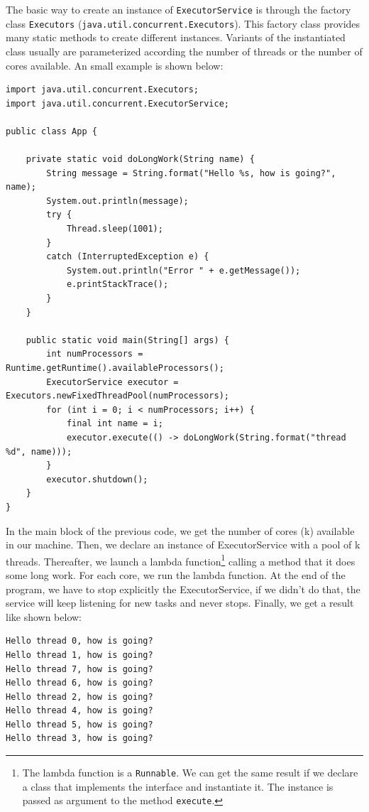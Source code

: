 \documentclass[openany, a4paper]{book}
\theoremstyle{break}
\theoremstyle{example}
\theoremstyle{note}
\theoremstyle{break}
\theoremstyle{exercise}
\begin{document}
The basic way to create an instance of \texttt{ExecutorService} is through the factory
class \texttt{Executors} (\texttt{java.util.concurrent.Executors}). This factory class provides
many static methods to create different instances. Variants of the
instantiated class usually are parameterized according the number of threads
or the number of cores available. An small example is shown below:

\begin{verbatim}
import java.util.concurrent.Executors;
import java.util.concurrent.ExecutorService;

public class App {

    private static void doLongWork(String name) {
        String message = String.format("Hello %s, how is going?", name);
        System.out.println(message);
        try {
            Thread.sleep(1001);
        }
        catch (InterruptedException e) {
            System.out.println("Error " + e.getMessage());
            e.printStackTrace();
        }
    }

    public static void main(String[] args) {
        int numProcessors = Runtime.getRuntime().availableProcessors();
        ExecutorService executor = Executors.newFixedThreadPool(numProcessors);
        for (int i = 0; i < numProcessors; i++) {
            final int name = i;
            executor.execute(() -> doLongWork(String.format("thread %d", name)));
        }
        executor.shutdown();
    }
}
\end{verbatim}

In the main block of the previous code, we get the number of cores (k)
available in our machine. Then, we declare an instance of ExecutorService
with a pool of k threads. Thereafter, we launch a lambda function\footnote{The lambda function is a \texttt{Runnable}. We can get the same result if we
declare a class that implements the interface and instantiate it. The instance
is passed as argument to the method \texttt{execute}.}
calling a method that it does some long work. For each core, we run the
lambda function. At the end of the program, we have to stop explicitly the
ExecutorService, if we didn't do that, the service will keep listening for
new tasks and never stops. Finally, we get a result like shown below:

\begin{verbatim}
Hello thread 0, how is going?
Hello thread 1, how is going?
Hello thread 7, how is going?
Hello thread 6, how is going?
Hello thread 2, how is going?
Hello thread 4, how is going?
Hello thread 5, how is going?
Hello thread 3, how is going?
\end{verbatim}
\end{document}
